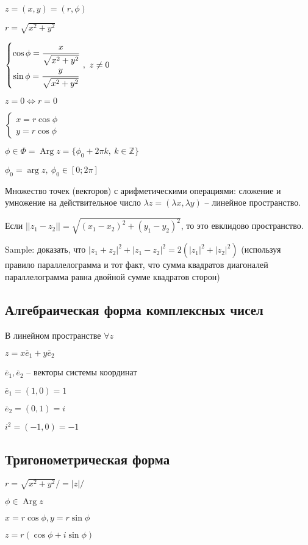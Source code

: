 \documentclass[draft]{report}
\newcommand{\Z}{\mathbb{Z}}
\newcommand{\LRA}{\Leftrightarrow}
\renewcommand{\bar}{\overline}
\newcommand{\Arg}{\mathop{\mathrm{Arg}}\nolimits}
\theoremstyle{remark}
\begin{document}
$z=(x,y)=(r,\phi)$

$r=\sqrt{x^2+y^2}$

$\left\{\begin{matrix}
\cos\phi=\cfrac{x}{\sqrt{x^2+y^2}} \\
\sin\phi=\cfrac{y}{\sqrt{x^2+y^2}}
\end{matrix}\right.\,,\ z\neq0$

$z=0\LRA r=0$

$\left\{\begin{matrix}
x=r\cos\phi\\
y=r\cos\phi
\end{matrix}\right.$

$\phi\in\Phi=\Arg z=\{\phi_0+2\pi k,\ k\in\Z\}$

$\phi_0=\arg z,\ \phi_0\in[0;2\pi]$

Множество точек (векторов) с арифметическими операциями: сложение и умножение на действительное число $\lambda z=(\lambda x, \lambda y)$ -- линейное пространство.

Если $||z_1-z_2||=\sqrt{(x_1-x_2)^2+(y_1-y_2)^2}$, то это евклидово пространство.

Sample: доказать, что $|z_1+z_2|^2+|z_1-z_2|^2=2(|z_1|^2+|z_2|^2)$ (используя правило параллелограмма и тот факт, что сумма квадратов диагоналей параллелограмма равна двойной сумме квадратов сторон)

\subsection{Алгебраическая форма комплексных чисел}

В линейном пространстве $\forall z$

$z=x\bar{e}_1+y\bar{e}_2$

$\bar{e}_1,\bar{e}_2$ -- векторы системы координат

$\bar{e}_1=(1,0)=1$

$\bar{e}_2=(0,1)=i$

$i^2=(-1,0)=-1$

\subsection{Тригонометрическая форма}

$r=\sqrt{x^2+y^2}/=|z|/$

$\phi\in \Arg z$

$x=r\cos\phi, y=r\sin\phi$

$z=r(\cos\phi+i\sin\phi)$
\end{document}
